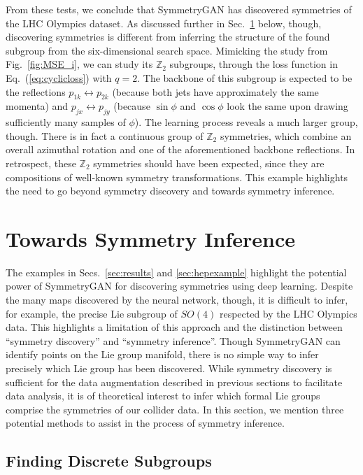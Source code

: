\documentclass[aps,prx,reprint,preprintnumbers,superscriptaddress,nofootinbib,longbibliography,floatfix]{revtex4-1}
\newcommand{\Z}{\mathbb{Z}}
\DeclareRobustCommand{\Sec}[1]{Sec.~\ref{sec:#1}}
\DeclareRobustCommand{\Secs}[2]{Secs.~\ref{sec:#1} and \ref{sec:#2}}
\DeclareRobustCommand{\Fig}[1]{Fig.~\ref{fig:#1}}
\DeclareRobustCommand{\Eq}[1]{Eq.~(\ref{eq:#1})}
\begin{document}
From these tests, we conclude that SymmetryGAN has discovered symmetries of the LHC Olympics dataset.
%
As discussed further in \Sec{inference} below, though, discovering symmetries is different from inferring the structure of the found subgroup from the six-dimensional search space.
%
Mimicking the study from \Fig{MSE_i}, we can study its $\Z_2$ subgroups, through the loss function in \Eq{cyclicloss} with $q=2$.
%
The backbone of this subgroup is expected to be the reflections $p_{1k}\leftrightarrow p_{2k}$ (because both jets have approximately the same momenta) and $p_{jx}\leftrightarrow p_{jy}$ (because $\sin\phi$ and $\cos\phi$ look the same upon drawing sufficiently many samples of $\phi$).
%
The learning process reveals a much larger group, though.
%
There is in fact a continuous group of $\Z_2$ symmetries, which combine an overall azimuthal rotation and one of the aforementioned backbone reflections.
%
In retrospect, these $\Z_2$ symmetries should have been expected, since they are compositions of well-known symmetry transformations.
%
This example highlights the need to go beyond symmetry discovery and towards symmetry inference.


\section{Towards Symmetry Inference}
\label{sec:inference}

The examples in \Secs{results}{hepexample} highlight the potential power of SymmetryGAN for discovering symmetries using deep learning.
%
Despite the many maps discovered by the neural network, though, it is difficult to infer, for example, the precise Lie subgroup of $SO(4)$ respected by the LHC Olympics data.
%
This highlights a limitation of this  approach and the distinction between ``symmetry discovery'' and ``symmetry inference''.
%
Though SymmetryGAN can identify points on the Lie group manifold, there is no simple way to infer precisely which Lie group has been discovered.
%
While symmetry discovery is sufficient for the data augmentation described in previous sections to facilitate data analysis, it is of theoretical interest to infer which formal Lie groups comprise the symmetries of our collider data.
%
In this section, we mention three potential methods to assist in the process of symmetry inference.

\subsection{Finding Discrete Subgroups}
\label{sec:discrete_subgroups}
\end{document}
